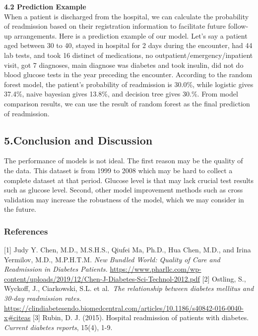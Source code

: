 \documentclass[
]{article}
\begin{document}
\textbf{4.2 Prediction Example}\\
When a patient is discharged from the hospital, we can calculate the
probability of readmission based on their registration information to
facilitate future follow-up arrangements. Here is a prediction example
of our model. Let's say a patient aged between 30 to 40, stayed in
hospital for 2 days during the encounter, had 44 lab tests, and took 16
distinct of medications, no outpatient/emergency/inpatient visit, got 7
diagnoses, main diagnose was diabetes and took insulin, did not do blood
glucose tests in the year preceding the encounter. According to the
random forest model, the patient's probability of readmission is 30.0\%,
while logistic gives 37.4\%, naive bayesian gives 13.8\%, and decision
tree gives 30.\%. From model comparison results, we can use the result
of random forest as the final prediction of readmission.

\hypertarget{conclusion-and-discussion}{%
\subsection{5.Conclusion and
Discussion}\label{conclusion-and-discussion}}

The performance of models is not ideal. The first reason may be the
quality of the data. This dataset is from 1999 to 2008 which may be hard
to collect a complete dataset at that period. Glucose level is that may
lack crucial test results such as glucose level. Second, other model
improvement methods such as cross validation may increase the robustness
of the model, which we may consider in the future.

\hypertarget{references}{%
\subsubsection{References}\label{references}}

{[}1{]} Judy Y. Chen, M.D., M.S.H.S., Qiufei Ma, Ph.D., Hua Chen, M.D.,
and Irina Yermilov, M.D., M.P.H.T.M. \emph{New Bundled World: Quality of
Care and Readmission in Diabetes Patients.}
\url{https://www.pharllc.com/wp-content/uploads/2019/12/Chen-J-Diabetes-Sci-Technol-2012.pdf}
{[}2{]} Ostling, S., Wyckoff, J., Ciarkowski, S.L. et al.~\emph{The
relationship between diabetes mellitus and 30-day readmission rates.}
\url{https://clindiabetesendo.biomedcentral.com/articles/10.1186/s40842-016-0040-x\#citeas}
{[}3{]} Rubin, D. J. (2015). Hospital readmission of patients with
diabetes. \emph{Current diabetes reports}, 15(4), 1-9.
\end{document}
